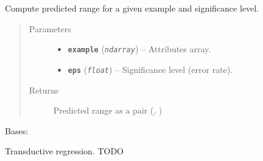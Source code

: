 \documentclass[letterpaper,10pt,english]{sphinxmanual}
\begin{document}
\begin{fulllineitems}
\begin{fulllineitems}
\begin{quote}
\begin{description}
\end{description}\end{quote}

\end{fulllineitems}


\begin{fulllineitems}
\label{cp.regression:cp.regression.ConformalRegressor.__call__}
Compute predicted range for a given example and significance level.
\begin{quote}\begin{description}
\item[{Parameters}] \leavevmode\begin{itemize}
\item {} 
\textbf{\texttt{example}} (\emph{\texttt{ndarray}}) -- Attributes array.

\item {} 
\textbf{\texttt{eps}} (\emph{\texttt{float}}) -- Significance level (error rate).

\end{itemize}

\item[{Returns}] \leavevmode
Predicted range as a pair (, )

\end{description}\end{quote}

\end{fulllineitems}


\end{fulllineitems}


\begin{fulllineitems}
\label{cp.regression:cp.regression.TransductiveRegressor}
Bases: {\hyperref[cp.regression:cp.regression.ConformalRegressor]{}}

Transductive regression. TODO

\end{fulllineitems}

\end{document}
